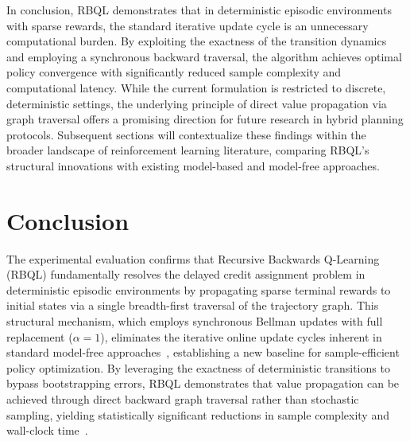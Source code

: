\documentclass[manuscript, screen, review]{jair}
\begin{document}
In conclusion, RBQL demonstrates that in deterministic episodic environments with sparse rewards, the standard iterative update cycle is an unnecessary computational burden. By exploiting the exactness of the transition dynamics and employing a synchronous backward traversal, the algorithm achieves optimal policy convergence with significantly reduced sample complexity and computational latency. While the current formulation is restricted to discrete, deterministic settings, the underlying principle of direct value propagation via graph traversal offers a promising direction for future research in hybrid planning protocols. Subsequent sections will contextualize these findings within the broader landscape of reinforcement learning literature, comparing RBQL's structural innovations with existing model-based and model-free approaches.

\section{Conclusion}
The experimental evaluation confirms that Recursive Backwards Q-Learning (RBQL) fundamentally resolves the delayed credit assignment problem in deterministic episodic environments by propagating sparse terminal rewards to initial states via a single breadth-first traversal of the trajectory graph. This structural mechanism, which employs synchronous Bellman updates with full replacement ($\alpha=1$), eliminates the iterative online update cycles inherent in standard model-free approaches~\cite{Jin2021BellmanED}, establishing a new baseline for sample-efficient policy optimization. By leveraging the exactness of deterministic transitions to bypass bootstrapping errors, RBQL demonstrates that value propagation can be achieved through direct backward graph traversal rather than stochastic sampling, yielding statistically significant reductions in sample complexity and wall-clock time~\cite{Diekhoff2024RecursiveBQ}.



\printbibliography


\end{document}
